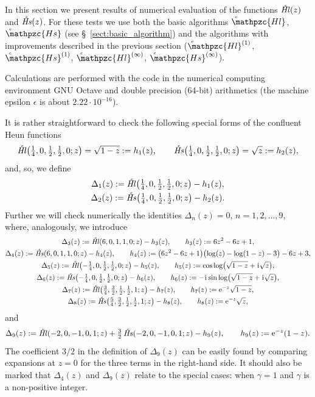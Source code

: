 \documentclass[11pt]{article}
\newcommand{\MF}[1]{\mathop{#1}\nolimits}
\newcommand{\ii}{\kern0.05em\mathrm{i}\kern0.05em} \newcommand{\E}[1]{\textrm{e}^{#1}}
\def\HeunCl{\setbox0=\hbox{\tiny\itshape\bfseries \kern1.52mm c}\wd0=0pt\ht0=0pt\dp0=0pt\MF{\textit{\hbox{\raise1.67ex\copy0}Hl\/}}}%
\def\HeunCs{\setbox0=\hbox{\tiny\itshape\bfseries \kern1.52mm c}\wd0=0pt\ht0=0pt\dp0=0pt\MF{\textit{\hbox{\raise1.67ex\copy0}Hs\/}}}%
\def\psHeunClfin{\setbox0=\hbox{\tiny\itshape\bfseries \kern1.52mm c}\wd0=0pt\ht0=0pt\dp0=0pt\MF{\hbox{\raise1.67ex\copy0}\mathpzc{Hl}}}%
\def\psHeunCsfin{\setbox0=\hbox{\tiny\itshape\bfseries \kern1.52mm c}\wd0=0pt\ht0=0pt\dp0=0pt\MF{\hbox{\raise1.67ex\copy0}\mathpzc{Hs}}}%
\def\psHeunClnearone{\setbox0=\hbox{\tiny\itshape\bfseries \kern1.52mm c}\wd0=0pt\ht0=0pt\dp0=0pt\MF{\hbox{\raise1.67ex\copy0}\mathpzc{Hl}^{(1)}}}%
\def\psHeunCsnearone{\setbox0=\hbox{\tiny\itshape\bfseries \kern1.52mm c}\wd0=0pt\ht0=0pt\dp0=0pt\MF{\hbox{\raise1.67ex\copy0}\mathpzc{Hs}^{(1)}}}%
\def\psHeunClnearinf{\setbox0=\hbox{\tiny\itshape\bfseries \kern1.52mm c}\wd0=0pt\ht0=0pt\dp0=0pt\MF{\hbox{\raise1.67ex\copy0}\mathpzc{Hl}^{(\infty)}}}%
\def\psHeunCsnearinf{\setbox0=\hbox{\tiny\itshape\bfseries \kern1.52mm c}\wd0=0pt\ht0=0pt\dp0=0pt\MF{\hbox{\raise1.67ex\copy0}\mathpzc{Hs}^{(\infty)}}}%
\begin{document}
In this section we present results of numerical evaluation of the functions
$\HeunCl(z)$ and $\HeunCs(z)$. For these tests we use both the basic algorithms $\psHeunClfin$, $\psHeunCsfin$ (see \S~\ref{sect:basic_algorithm}) and the algorithms with improvements described in the previous section ($\psHeunClnearone$, $\psHeunCsnearone$, $\psHeunClnearinf$, $\psHeunCsnearinf$).

Calculations are performed with the code \cite{mycode2} in the numerical computing environment GNU Octave and double precision (64-bit)
arithmetics (the machine epsilon $\epsilon$ is about $2.22\cdot10^{-16}$).

It is rather straightforward to check the following special forms of the confluent Heun functions
\begin{equation*}
\HeunCl\bigl(\tfrac14,0,\tfrac12,\tfrac12,0;z\bigr)=\sqrt{1-z}:=h_1(z),\qquad 
\HeunCs\bigl(\tfrac14,0,\tfrac12,\tfrac12,0;z\bigr)=\sqrt{z}:=h_2(z),
\end{equation*}
and, so, we define
\begin{gather*}
\Delta_1(z):=\HeunCl\bigl(\tfrac14,0,\tfrac12,\tfrac12,0;z\bigr)-h_1(z),\\
\Delta_2(z):=\HeunCs\bigl(\tfrac14,0,\tfrac12,\tfrac12,0;z\bigr)-h_2(z).
\end{gather*}
Further we will check numerically the identities $\Delta_n(z)=0$, $n=1,2,\ldots,9$, where, analogously, we introduce
\begin{gather*}
\Delta_3(z):=\HeunCl(6,0,1,1,0;z)-h_3(z),\qquad h_3(z):=6 z^2-6 z+1,\\
\Delta_4(z):=\HeunCs(6,0,1,1,0;z)-h_4(z),\qquad h_4(z):=\bigl(6 z^2-6 z+1\bigr)\bigl(\log(z)-\log(1-z)-3\bigr)-6 z+3,\\
\Delta_5(z):=\HeunCl\bigl(-\tfrac14,0,\tfrac12,\tfrac12,0;z\bigr)-h_5(z),\qquad h_5(z):=\cos\log\bigl(\sqrt{1-z}+\ii\sqrt{z}\bigr),\\
\Delta_6(z):=\HeunCs\bigl(-\tfrac14,0,\tfrac12,\tfrac12,0;z\bigr)-h_6(z),\qquad h_6(z):=-\ii\sin\log\bigl(\sqrt{1-z}+\ii\sqrt{z}\bigr),\\
\Delta_7(z):=\HeunCl\bigl(\tfrac34,\tfrac32,\tfrac12,\tfrac12,1;z\bigr)-h_7(z),\qquad h_7(z):=\E{-z}\sqrt{1-z},\\
\Delta_8(z):=\HeunCs\bigl(\tfrac54,\tfrac32,\tfrac12,\tfrac12,1;z\bigr)-h_8(z),\qquad h_8(z):=\E{-z}\sqrt{z},
\end{gather*}
and
\begin{equation*}
\Delta_9(z):=\HeunCl(-2,0,-1,0,1;z)+\tfrac32\HeunCs(-2,0,-1,0,1;z)-h_9(z),\qquad h_9(z):=\E{-z}(1-z).
\label{eq:Delta9}
\end{equation*}
The coefficient $3/2$ in the definition of $\Delta_9(z)$ can be easily found by comparing expansions at $z=0$ for the three terms in the right-hand side. It should also be marked that $\Delta_4(z)$ and $\Delta_9(z)$ relate to the special cases: when $\gamma=1$ and $\gamma$ is a non-positive integer. 
\end{document}
